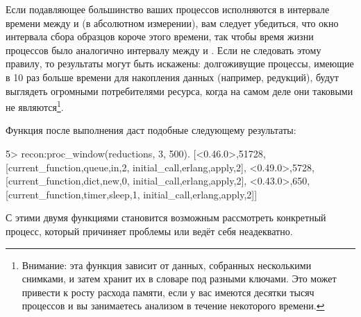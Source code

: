 Если подавляющее большинство ваших процессов исполняются в интервале времени между  и  (в абсолютном измерении), вам следует убедиться, что окно интервала сбора образцов короче этого времени, так чтобы время жизни процессов было аналогично интервалу между  и . Если не следовать этому правилу, то результаты могут быть искажены: долгоживущие процессы, имеющие в 10 раз больше времени для накопления данных (например, редукций), будут выглядеть огромными потребителями ресурса, когда на самом деле они таковыми не являются\footnote{Внимание: эта функция зависит от данных, собранных несколькими снимками, и затем хранит их в словаре под разными ключами. Это может привести к росту расхода памяти, если у вас имеются десятки тысяч процессов и вы занимаетесь анализом в течение некоторого времени.}.

Функция после выполнения даст подобные следующему результаты:

\begin{VerbatimEshell}
5> recon:proc_window(reductions, 3, 500).
[{<0.46.0>,51728,
  [{current_function,{queue,in,2}},
   {initial_call,{erlang,apply,2}}]},
 {<0.49.0>,5728,
  [{current_function,{dict,new,0}},
   {initial_call,{erlang,apply,2}}]},
 {<0.43.0>,650,
  [{current_function,{timer,sleep,1}},
   {initial_call,{erlang,apply,2}}]}]
\end{VerbatimEshell}

С этими двумя функциями становится возможным рассмотреть конкретный процесс, который причиняет проблемы или ведёт себя неадекватно.


